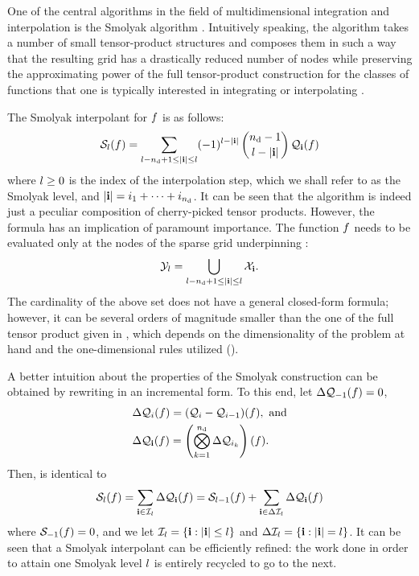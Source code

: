 One of the central algorithms in the field of multidimensional integration and
interpolation is the Smolyak algorithm \cite{smolyak1963}. Intuitively speaking,
the algorithm takes a number of small tensor-product structures and composes
them in such a way that the resulting grid has a drastically reduced number of
nodes while preserving the approximating power of the full tensor-product
construction for the classes of functions that one is typically interested in
integrating or interpolating \cite{klimke2006}.

The Smolyak interpolant for $f$ is as follows:
\begin{equation} \elab{smolyak-original}
  \smolyak{\l}(\f) = \sum_{\l - \nin + 1 \leq |\vi| \leq \l} (-1)^{\l - |\vi|} \, {\nin - 1 \choose \l - |\vi|} \, \tensor{\vi}(\f)
\end{equation}
where $l \geq 0$ is the index of the interpolation step, which we shall refer
to as the Smolyak level, and $|\mathbf{i}| = i_1 + \dots + i_{n_\text{d}}$. It can be seen that
the algorithm is indeed just a peculiar composition of cherry-picked tensor
products. However, the formula has an implication of paramount importance.
The function $f$ needs to be evaluated only at the nodes of the sparse grid
underpinning :
\begin{equation} \elab{smolyak-grid}
  \Y_l = \bigcup_{\l - \nin + 1 \leq |\vi| \leq \l} \X_\vi.
\end{equation}
The cardinality of the above set does not have a general closed-form formula;
however, it can be several orders of magnitude smaller than the one of the full
tensor product given in , which depends on the
dimensionality of the problem at hand and the one-dimensional rules utilized
().

A better intuition about the properties of the Smolyak construction can be
obtained by rewriting  in an incremental form. To this
end, let $\Delta\mathcal{Q}_{-1}(f) = 0$,
\begin{align}
  & \Delta\tensor{i}(\f) = (\tensor{i} - \tensor{i - 1})(\f), \text{ and} \elab{tensor-delta-1d} \\
  & \Delta\tensor{\vi}(\f) = \left( \bigotimes_{k = 1}^\nin \Delta\tensor{i_k} \right)(\f). \nonumber
\end{align}
Then,  is identical to
\begin{equation} \elab{smolyak-incremental}
  \smolyak{\l}(\f) = \sum_{\vi \in \lindex_\l} \Delta\tensor{\vi}(\f) = \smolyak{\l - 1}(\f) + \sum_{\vi \in \Delta\lindex_\l} \Delta\tensor{\vi}(\f)
\end{equation}
where $\mathcal{S}_{-1}(f) = 0$, and we let $\mathcal{I}_l = \{ \mathbf{i}: |\mathbf{i}| \leq l
\}$ and $\Delta\mathcal{I}_l = \{ \mathbf{i}: |\mathbf{i}| = l \}$. It can be seen that a
Smolyak interpolant can be efficiently refined: the work done in order to attain
one Smolyak level $l$ is entirely recycled to go to the next.

